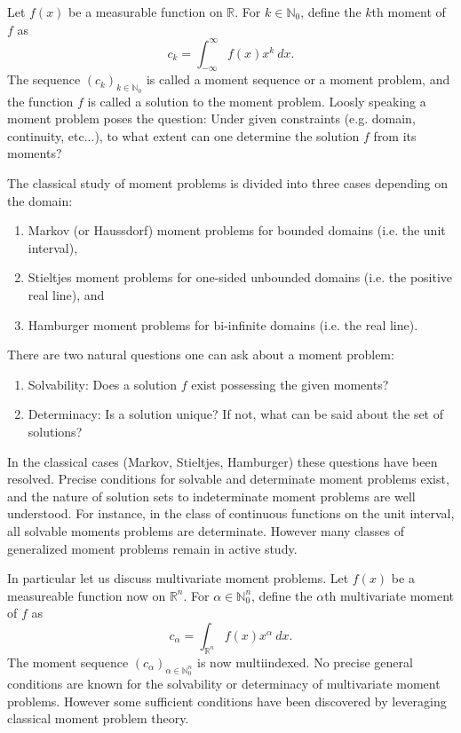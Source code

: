 \documentclass{amsart}
\theoremstyle{remark}
\numberwithin{equation}{section}
\newcommand{\RR}{\mathbb{R}}
\newcommand{\NN}{\mathbb{N}}
\begin{document}
\cite{Zalc82} 
\cite{Helg65}
Let $f(x)$ be a measurable function on $\RR$. For $k \in \NN_0$, define the $k$th moment of $f$ as
\[
    c_k = \int_{-\infty}^\infty f(x)x^k ~dx.
\]
The sequence $(c_k)_{k \in \NN_0}$ is called a moment sequence or a moment problem, and the function $f$ is called a solution to the moment problem. Loosly speaking a moment problem poses the question: Under given constraints (e.g. domain, continuity, etc...), to what extent can one determine the solution $f$ from its moments?

The classical study of moment problems is divided into three cases depending on the domain: 
\begin{enumerate}
\item Markov (or Haussdorf) moment problems for bounded domains (i.e. the unit interval), 
\item Stieltjes moment problems for one-sided unbounded domains (i.e. the positive real line), and 
\item Hamburger moment problems for bi-infinite domains (i.e. the real line).
\end{enumerate}

There are two natural questions one can ask about a moment problem:
\begin{enumerate}
\item Solvability: Does a solution $f$ exist possessing the given moments?
\item Determinacy: Is a solution unique? If not, what can be said about the set of solutions?
\end{enumerate}
In the classical cases (Markov, Stieltjes, Hamburger) these questions have been resolved. Precise conditions for solvable and determinate moment problems exist, and the nature of solution sets to indeterminate moment problems are well understood. For instance, in the class of continuous functions on the unit interval, all solvable moments problems are determinate. However many classes of generalized moment problems remain in active study.

In particular let us discuss multivariate moment problems. Let $f(x)$ be a measureable function now on $\RR^n$. For $\alpha \in \NN_0^n$, define the $\alpha$th multivariate moment of $f$ as 
\[
    c_\alpha = \int_{\RR^n} f(x)x^\alpha ~ dx.
\]
The moment sequence $(c_\alpha)_{\alpha \in \NN_0^n}$ is now multiindexed. No precise general conditions are known for the solvability or determinacy of multivariate moment problems. However some sufficient conditions have been discovered by leveraging classical moment problem theory. \cite{Pete82}
\end{document}
